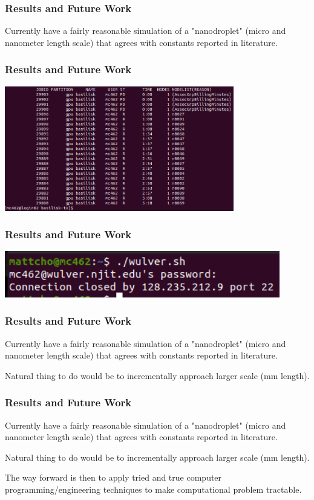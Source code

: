 \documentclass[12pt]{beamer}
\begin{document}
\begin{frame}
    \frametitle{Results and Future Work}
    Currently have a fairly reasonable simulation of a "nanodroplet" (micro and
    nanometer length scale) that agrees with constants reported in literature.
\end{frame}
\begin{frame}
    \frametitle{Results and Future Work}
    \includegraphics[width=0.75\textwidth]{img/8-slurm.png}
\end{frame}
\begin{frame}
    \frametitle{Results and Future Work}
    \includegraphics[width=0.9\textwidth]{img/9-njit.png}
\end{frame}
\begin{frame}
    \frametitle{Results and Future Work}
    Currently have a fairly reasonable simulation of a "nanodroplet" (micro and
    nanometer length scale) that agrees with constants reported in literature.

    Natural thing to do would be to incrementally approach larger scale 
    (mm length).
\end{frame}
\begin{frame}
    \frametitle{Results and Future Work}
    Currently have a fairly reasonable simulation of a "nanodroplet" (micro and
    nanometer length scale) that agrees with constants reported in literature.

    Natural thing to do would be to incrementally approach larger scale 
    (mm length).

    The way forward is then to apply tried and true computer 
    programming/engineering techniques to make computational problem tractable.
\end{frame}
\end{document}
